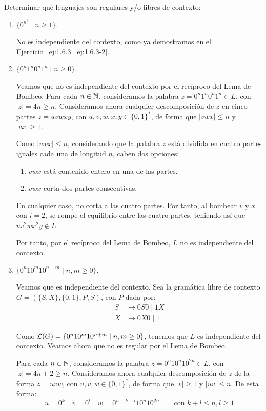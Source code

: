 \begin{ejercicio}\label{ej:1.6.6}
    Determinar qué lenguajes son regulares y/o libres de contexto:
    \begin{enumerate}
        \item $\{0^{n^2}\mid n\geq 1\}$.
        
        No es independiente del contexto, como ya demostramos en el Ejercicio~\ref{ej:1.6.3}.\ref{ej:1.6.3-2}.
        \item $\{0^n 1^n 0^n 1^n \mid n \geq 0\}$.
        
        Veamos que no es independiente del contexto por el recíproco del Lema de Bombeo. Para cada $n\in \mathbb{N}$, consideramos la palabra $z=0^n1^n0^n1^n\in L$, con $|z|=4n\geq n$. Consideramos ahora cualquier descomposición de $z$ en cinco partes $z=uvwxy$, con $u,v,w,x,y\in {\{0,1\}}^{\ast}$, de forma que $|vwx|\leq n$ y $|vx|\geq 1$.

        Como $|vwx|\leq n$, considerando que la palabra $z$ está dividida en cuatro partes iguales cada una de longitud $n$, caben dos opciones:
        \begin{enumerate}
            \item $vwx$ está contenido entero en una de las partes.
            \item $vwx$ corta dos partes consecutivas.
        \end{enumerate}

        En cualquier caso, no corta a las cuatro partes. Por tanto, al bombear $v$ y $x$ con $i=2$, se rompe el equilibrio entre las cuatro partes, teniendo así que $uv^2wx^2y\notin L$.

        Por tanto, por el recíproco del Lema de Bombeo, $L$ no es independiente del contexto.
        \item $\{0^n 10^m 10^{n+m}\mid n,m\geq 0\}$.
        
        Veamos que es independiente del contexto. Sea la gramática libre de contexto $G=(\{S,X\},\{0,1\},P,S)$, con $P$ dada por:
        \begin{align*}
            S &\rightarrow 0S0 \mid 1X \\
            X &\rightarrow 0X0 \mid 1
        \end{align*}

        Como $\mathcal{L}(G)=\{0^n 10^m 10^{n+m}\mid n,m\geq 0\}$, tenemos que $L$ es independiente del contexto. Veamos ahora que no es regular por el Lema de Bombeo.

        Para cada $n\in \mathbb{N}$, consideramos la palabra $z=0^n10^n10^{2n}\in L$, con $|z|=4n+2\geq n$. Consideramos ahora cualquier descomposición de $z$ de la forma $z=uvw$, con $u,v,w\in {\{0,1\}}^{\ast}$, de forma que $|v|\geq 1$ y $|uv|\leq n$. De esta forma:
        \begin{equation*}
            u=0^k \quad v=0^l \quad w=0^{n-k-l}10^n10^{2n}\qquad \text{con } k+l\leq n, l\geq 1
        \end{equation*}


\end{enumerate}
\end{ejercicio}

